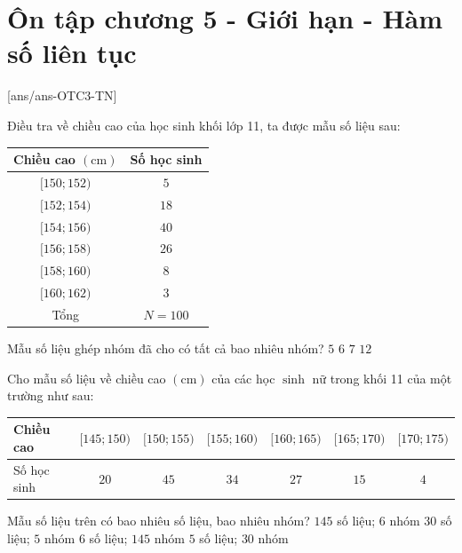 \section{Ôn tập chương 5 - Giới hạn - Hàm số liên tục}
[ans/ans-OTC3-TN]
\caulc
\begin{ex}%
Điều tra về chiều cao của học sinh khối lớp 11, ta được mẫu số liệu sau:
\begin{center}
\begin{tabular}{|c|c|}
\hline Chiều cao $(\mathrm{cm})$ & Số học sinh \\
\hline$[150; 152)$ & $5$ \\
\hline$[152; 154)$ & $18$ \\
\hline$[154; 156)$ & $40$ \\
\hline$[156; 158)$ & $26$ \\
\hline$[158; 160)$ & $8$ \\
\hline$[160; 162)$ & $3$ \\
\hline Tổng & $N=100$ \\
\hline
\end{tabular}
\end{center}
Mẫu số liệu ghép nhóm đã cho có tất cả bao nhiêu nhóm?
	\choice
	{$5$}
	{\True $6$}
	{$7$}
	{$12$}
\end{ex}

\begin{ex}%
Cho mẫu số liệu về chiều cao $(\mathrm{cm})$ của các học $\sinh$ nữ trong khối 11 của một trường như sau:
\begin{center}
\begin{tabular}{|l|c|c|c|c|c|c|}
\hline Chiều cao & {$[145; 150)$} & {$[150; 155)$} & {$[155; 160)$} & {$[160; 165)$} & {$[165; 170)$} & {$[170; 175)$} \\
\hline Số học sinh & $20$ & $45$ & $34$ & $27$ & $15$ & $4$ \\
\hline
\end{tabular}
\end{center}
Mẫu số liệu trên có bao nhiêu số liệu, bao nhiêu nhóm?
	\choice
	{$145$ số liệu; $6$ nhóm}
	{$30$ số liệu; $5$ nhóm}
	{\True $6$ số liệu; $145$ nhóm}
	{$5$ số liệu; $30$ nhóm}
	\loigiai{
Mẫu số liệu $(T)$ có
$$20+45+34+27+15+4=145\text{ (số liệu).}$$
$6$ nhóm là $[145; 150)$; $[150; 155)$; $[155; 160)$; $[160; 165)$; $[165; 170)$; $[170; 175)$.
}
\end{ex}

